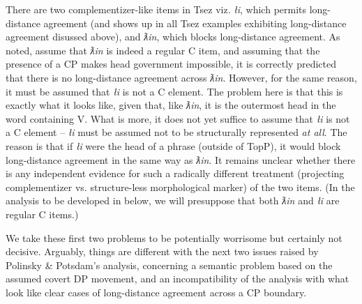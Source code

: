 \documentclass[output=paper
,modfonts
,nonflat]{langsci/langscibook}
\begin{document}
	
There are two comp\-lement\-izer-like items in Tsez viz. {\itshape {\l}i},
	which permits long-distance agreement (and shows up in all Tsez
	examples exhibiting long-distance agreement disussed above), and {\it
		ƛin}, which blocks long-distance agreement. As noted,
	\citet{PolinskyPotsdam:01} assume that {\itshape ƛin} is
	indeed a regular C item, and assuming that the presence of a CP makes
	head government impossible, it is correctly predicted that there is no
	long-distance agreement across {\itshape ƛin}.
	However,  for the same reason, it must be assumed that {\itshape {\l}i} is
	not a C element. The problem here is that this is exactly what
	it looks like, given that, like {\itshape ƛin}, it is the
	outermost head in the word containing V. What is more, it does not yet suffice to
	assume that  {\itshape {\l}i} is not a C element -- {\itshape {\l}i} must  be
	assumed not to be structurally represented {\itshape at all}. The reason is
	that if {\itshape {\l}i} were the head of a phrase (outside of TopP), it would block
	long-distance agreement in the same way as {\itshape ƛin}. 
	It remains unclear whether there is any independent evidence for such
	a radically different treatment (projecting complementizer
	vs. structure-less morphological marker) of the two items. (In the
	analysis to be developed in  below, we will presuppose that
	both  {\itshape ƛin} and {\itshape {\l}i} are regular C items.)
	
	We take these first two problems to be potentially worrisome but
	certainly not decisive. Arguably, things are different with the next
	two issues raised by Polinsky \& Potsdam's analysis, concerning a
	semantic problem based on the assumed covert DP movement, and an
	incompatibility of the analysis with what look like clear cases of
	long-distance agreement across a CP boundary.
	
	
	
\end{document}
